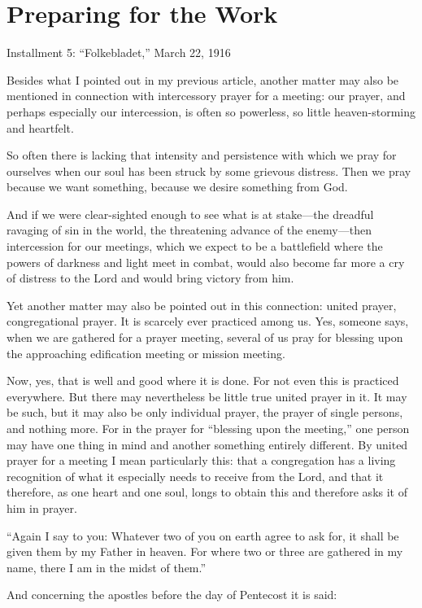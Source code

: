 
\section{Preparing for the Work}

Installment 5: “Folkebladet,” March 22, 1916

Besides what I pointed out in my previous article, another matter may also be mentioned in connection with intercessory prayer for a meeting: our prayer, and perhaps especially our intercession, is often so powerless, so little heaven-storming and heartfelt.

So often there is lacking that intensity and persistence with which we pray for ourselves when our soul has been struck by some grievous distress. Then we pray because we want something, because we desire something from God.

And if we were clear-sighted enough to see what is at stake—the dreadful ravaging of sin in the world, the threatening advance of the enemy—then intercession for our meetings, which we expect to be a battlefield where the powers of darkness and light meet in combat, would also become far more a cry of distress to the Lord and would bring victory from him.

Yet another matter may also be pointed out in this connection: united prayer, congregational prayer. It is scarcely ever practiced among us. Yes, someone says, when we are gathered for a prayer meeting, several of us pray for blessing upon the approaching edification meeting or mission meeting.

Now, yes, that is well and good where it is done. For not even this is practiced everywhere. But there may nevertheless be little true united prayer in it. It may be such, but it may also be only individual prayer, the prayer of single persons, and nothing more. For in the prayer for “blessing upon the meeting,” one person may have one thing in mind and another something entirely different. By united prayer for a meeting I mean particularly this: that a congregation has a living recognition of what it especially needs to receive from the Lord, and that it therefore, as one heart and one soul, longs to obtain this and therefore asks it of him in prayer.

“Again I say to you: Whatever two of you on earth agree to ask for, it shall be given them by my Father in heaven. For where two or three are gathered in my name, there I am in the midst of them.”

And concerning the apostles before the day of Pentecost it is said:

